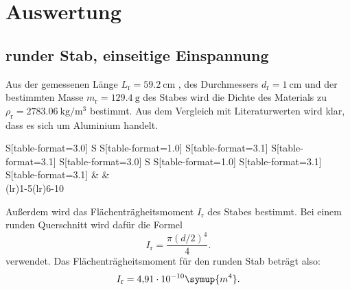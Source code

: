 \section{Auswertung}
\label{sec:Auswertung}

\subsection{runder Stab, einseitige Einspannung}

Aus der gemessenen Länge $L_{\text{r}}= \qty{59,2}{\centi\meter}$ , des Durchmessers $d_{\text{r}}= \qty{1}{\centi\meter}$ und der bestimmten Masse $m_{\text{r}}= \qty{129,4}{\gram}$
 des Stabes wird die Dichte des Materials zu $\rho_{\text{r}} = \qty{2783,06}{\kilo\gram\per\cubic\meter}$ bestimmt.
Aus dem Vergleich mit Literaturwerten \cite{Dichte} wird klar, dass es sich um Aluminium handelt.
\begin{table}
  \centering
  \caption{Maße des runden und des eckigen Stabes}
  \begin{tabular}{S[table-format=3.0]
      S
      S[table-format=1.0]
      S[table-format=3.1]
      S[table-format=3.1]
      S[table-format=3.0]
      S
      S[table-format=1.0]
      S[table-format=3.1]
      S[table-format=3.1]}
    \toprule
    &  &  \\
    \cmidrule(lr){1-5}\cmidrule(lr){6-10}
    
  \end{tabular}
\end{table}



Außerdem wird das Flächenträgheitsmoment $I_{\text{r}}$  des Stabes bestimmt. Bei einem runden Querschnitt wird dafür die Formel \cite{flaeche}
\begin{equation*}
  I_{\text{r}} = \frac{\pi (d/2)^4}{4}.
\end{equation*} verwendet.
Das Flächenträgheitsmoment für den runden Stab beträgt also: 
\begin{equation*}
  I_{\text{r}} = \num{4,91e-10}\symup{m^4}.
\end{equation*}


